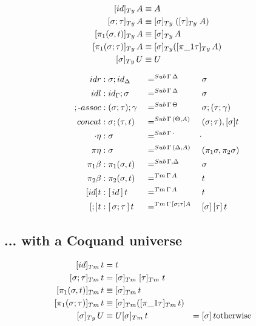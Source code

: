 \documentclass[a4paper,UKenglish,numberwithinsect,cleveref,thm-restate]{lipics-v2021}
\begin{document}
\begin{alignat*}{3}
[ \idS ]_{\Ty}\,A             & \jdeq A \\
[ \sigma ; \tau ]_{\Ty}\,A    & \jdeq [ \sigma ]_{\Ty}\;([ \tau ]_{\Ty}\;A) \\
[ \pi_1(\sigma, t) ]_{\Ty}\,A & \jdeq [\sigma]_\Ty\,A \\
[ \pi_1(\sigma; \tau) ]_{\Ty}\,A & \jdeq [\sigma]_\Ty ([\pi\_1\tau]_\Ty \,A) \\
[ \sigma ]_{\Ty}\,U           & \jdeq U
\end{alignat*}

\begin{alignat*}{3}
  \mathsf{idr}    & : {\sigma ; \idS_{\Delta}} && =^{\Sub\,\Gamma\,\Delta} && {\sigma} \\
  \mathsf{idl}    & : {\idS_{\Gamma} ; \sigma} && =^{\Sub\,\Gamma\,\Delta} && {\sigma} \\
  ;\text{-}\mathsf{assoc} & : (\sigma ; \tau) ; \gamma && =^{\Sub\,\Gamma\,\Theta} &&  \sigma ; (\tau ; \gamma) \\
  \mathsf{concat} & : \sigma ; (\tau , t)      && =^{\Sub\,\Gamma\,(\Theta, A)} &&  (\sigma ; \tau) , [ \sigma ] t \\
  \emptyctx\eta   & : \sigma                   && =^{\Sub\,\Gamma\,\emptyctx} & \emptysub \\
  \pi\eta         & : \sigma                   && =^{\Sub\,\Gamma\,(\Delta, A)} &&  (\pi_1 \sigma, \pi_2 \sigma) \\
  \pi_1\beta      & : \pi_1(\sigma , t)        && =^{\Sub\,\Gamma,\Delta} &&  \sigma \\
  \pi_2\beta      & : \pi_2(\sigma , t)        && =^{\Tm\,\Gamma\, A} &&  t \\
  [\idS]t         & : {[\,\idS\,]\,t}          && =^{\Tm\,\Gamma\,A} && t \\
  [;]t            & : {[\,\sigma ; \tau\,]\,t} && =^{\Tm\,\Gamma\,[\sigma ; \tau] A} && {[ \sigma ]\,[ \tau ]\,t} \\
\end{alignat*}

\subsection{... with a Coquand universe} \label{subsec:SC+U}
\cite{Coquand2013}
\begin{alignat*}{3}
[ \idS ]_{\Tm}\,t          & = t \\
[ \sigma ; \tau ]_{\Tm}\,t & = [ \sigma ]_{\Tm}\;[ \tau ]_{\Tm}\;t \\
[ \pi_1(\sigma, t) ]_{\Tm}\,t & \jdeq [\sigma]_\Tm\,t \\
[ \pi_1(\sigma; \tau) ]_{\Tm}\,t & \jdeq [\sigma]_\Tm ([\pi\_1\tau]_\Tm \,t) \\
[ \sigma ]_{\Ty}\,U           & \jdeq U
[ \sigma ]_{\Tm}\,t        & = [ \sigma ]\,t & \text{otherwise}  \\
\end{alignat*}
\end{document}
